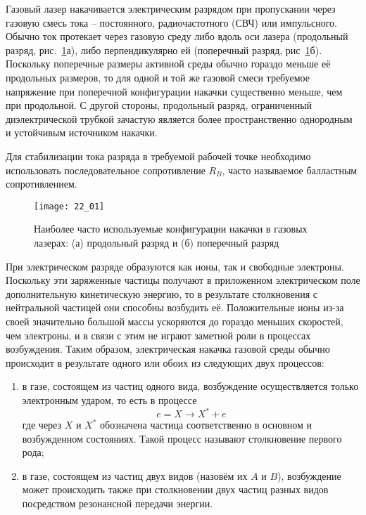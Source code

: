 
Газовый лазер накачивается электрическим разрядом при пропускании через 
газовую смесь тока -- постоянного, радиочастотного (СВЧ) или импульсного. 
Обычно ток протекает через газовую среду либо вдоль оси лазера 
(продольный разряд, рис.~\ref{img22.1}а), либо перпендикулярно ей (поперечный 
разряд, рис~\ref{img22.1}б). Поскольку поперечные размеры активной среды 
обычно гораздо меньше её продольных размеров, то для одной и той же газовой 
смеси требуемое напряжение при поперечной конфигурации накачки существенно 
меньше, чем при продольной. С другой стороны, продольный разряд, ограниченный 
диэлектрической трубкой зачастую является более пространственно однородным и 
устойчивым источником накачки. 

Для стабилизации тока разряда в требуемой рабочей точке необходимо 
использовать последовательное сопротивление \( R_B \), часто называемое 
балластным сопротивлением. 

\begin{figure}[h!]
    \center
    \texttt{[image: 22\_01]}
    \caption{Наиболее часто используемые конфигурации накачки в газовых 
    	лазерах: (а) продольный разряд и (б) поперечный разряд}
    \label{img22.1}
\end{figure}

При электрическом разряде образуются как ионы, так и свободные электроны. 
Поскольку эти заряженные частицы получают в приложенном электрическом поле 
дополнительную кинетическую энергию, то в результате столкновения с 
нейтральной частицей они способны возбудить её. Положительные ионы из-за 
своей значительно большой массы ускоряются до гораздо меньших скоростей, чем 
электроны, и в связи с этим не играют заметной роли в процессах возбуждения. 
Таким образом, электрическая накачка газовой среды обычно происходит в 
результате одного или обоих из следующих двух процессов:
\begin{enumerate}
	\item в газе, состоящем из частиц одного вида, возбуждение осуществляется 
		только электронным ударом, то есть в процессе 
		\[ e = X \rightarrow X^{*} + e \]
		где через \( X \) и \( X^{*} \) обозначена частица соответственно в 
		основном и возбужденном состояниях. Такой процесс называют 
		столкновение первого рода;
	\item в газе, состоящем из частиц двух видов (назовём их \( A \) и 
		\( B \)), возбуждение может происходить также при столкновении двух 
		частиц разных видов посредством резонансной передачи энергии.
\end{enumerate}


